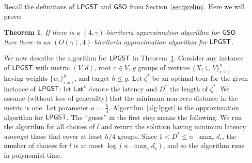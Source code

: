 \documentclass[11pt]{article}
\newtheorem{theorem}[thm]{Theorem}
\def\sse{\subseteq}
\def\lat{{\sf Lat}\xspace}
\def\lpgst{\ensuremath{{\sf LPGST}}\xspace}
\def\gso{\ensuremath{{\sf GSO}}\xspace}
\begin{document}
Recall the definitions of \lpgst and \gso from Section~\ref{sec:prelim}. Here we will prove:
\begin{theorem}\label{thm:lpgs}
If there is a $(4,\gamma)$-bicriteria approximation algorithm for \gso then there is an $(O(\gamma), 4)$-bicriteria approximation algorithm for \lpgst.
\end{theorem}






We now describe the  algorithm for \lpgst in Theorem~\ref{thm:lpgs}.  Consider any instance of \lpgst with metric
$(V,d)$, root $r\in V$, $g$ groups of vertices $\{X_i\sse V\}_{i=1}^g$ having weights $\{w_i\}_{i=1}^g$,  and
target $h\le g$. Let $\zeta^*$ be an optimal tour for the given instance of \lpgst: let $\lat^*$ denote the
latency and $D^*$ the length of $\zeta^*$. We assume (without loss of generality) that the minimum non-zero distance in the metric is one. Let parameter $a:=\frac54$.
 Algorithm~\ref{alg:lpgst} is the
approximation algorithm for \lpgst.
The ``guess'' in the first step means the following. We run the algorithm for all choices of $l$ and return the
solution having minimum latency {\em amongst} those that cover at least $h/4$ groups. Since $1<D^*\le n\cdot \max_e d_e$, the number of choices for $l$ is at most $\log\left(n\cdot \max_{e} d_e\right)$, and so the algorithm runs in polynomial time. 
\end{document}
